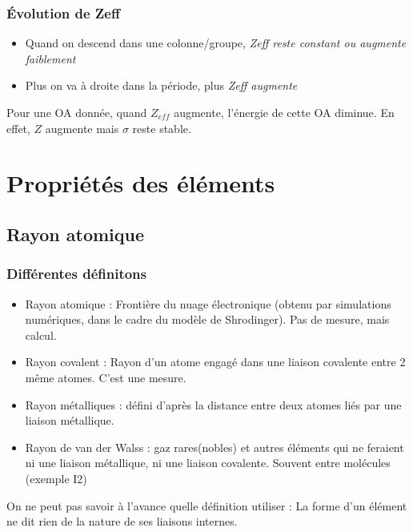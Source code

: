 \documentclass[french]{yLectureNote}
\begin{document}
\subsubsection{Évolution de Zeff}

\begin{itemize}
 \item Quand on descend dans une colonne/groupe, \emph{Zeff reste constant ou augmente faiblement}
 \item Plus on va à droite dans la période, plus \emph{Zeff augmente}
\end{itemize}

Pour une OA donnée, quand $Z_{eff}$ augmente, l'énergie de cette OA diminue. En effet, $Z$ augmente mais $\sigma$ reste stable.
\section{Propriétés des éléments}
\subsection{Rayon atomique}
\subsubsection{Différentes définitons}

\begin{itemize}
 \item Rayon atomique : Frontière du nuage électronique (obtenu par simulations numériques, dans le cadre du modèle de Shrodinger). Pas de mesure, mais calcul.
 \item Rayon covalent : Rayon d'un atome engagé dans une liaison covalente entre 2 m\^eme atomes. C'est une mesure.
 \item Rayon métalliques : défini d’après la distance entre deux
atomes liés par une liaison
métallique.
\item Rayon de van der Walss : gaz rares(nobles) et autres éléments qui ne
feraient ni une liaison métallique, ni une liaison covalente. Souvent entre molécules (exemple I2)
\end{itemize}

On ne peut pas savoir à l'avance quelle définition utiliser : La forme d'un élément ne dit rien de la nature de ses liaisons internes.
\end{document}
